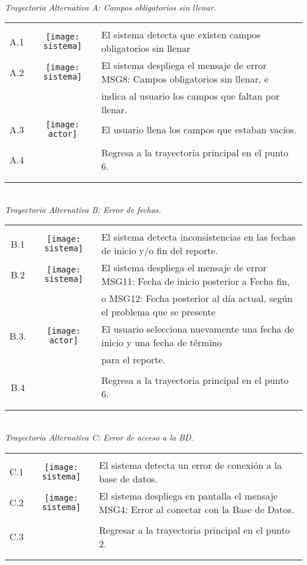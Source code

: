 \documentclass[10pt,spanish]{article}
\providecommand{\tabularnewline}{\\}
\begin{document}
\newpage
	\textit{\large \\Trayectoria Alternativa A: Campos obligatorios sin llenar.}
	
	\begin{tabular}{ccl}
	& & \tabularnewline
			
	A.1 & \texttt{[image: sistema]} & El sistema detecta que existen campos obligatorios sin llenar\tabularnewline
	
	A.2 & \texttt{[image: sistema]} & El sistema despliega el mensaje de error MSG8: Campos obligatorios sin llenar, e \tabularnewline
	& & indica al usuario los campos que faltan por llenar. \tabularnewline

    A.3 & \texttt{[image: actor]} & El usuario llena los campos que estaban vacíos.\tabularnewline
	\tabularnewline
	
	A.4 & &	Regresa a la trayectoria principal en el punto 6.\tabularnewline

	
	\tabularnewline\tabularnewline	
	\end{tabular}
	
	\textit{\large \\Trayectoria Alternativa B: Error de fechas.}
	
	\begin{tabular}{ccl}
	& & \tabularnewline
			
	B.1 & \texttt{[image: sistema]} & El sistema detecta inconsistencias en las fechas de inicio y/o fin del reporte.\tabularnewline
	
	B.2 & \texttt{[image: sistema]} & El sistema despliega el mensaje de error MSG11: Fecha de inicio posterior a Fecha fin,  \tabularnewline
	& & o MSG12: Fecha posterior al día actual, según el problema que se presente \tabularnewline

    B.3. & \texttt{[image: actor]} & El usuario selecciona nuevamente una fecha de inicio y una fecha de término \tabularnewline
	&  & para el reporte.\tabularnewline\tabularnewline
	
	B.4 & &	Regresa a la trayectoria principal en el punto 6.\tabularnewline

	
	\tabularnewline\tabularnewline	
	\end{tabular}

\textit{\large \\Trayectoria Alternativa C: Error de acceso a la BD.}

\begin{tabular}{ccl}
	& & \tabularnewline
	
	C.1 & \texttt{[image: sistema]} & El sistema detecta un error de conexión a la base de datos.\tabularnewline
		
	C.2 & \texttt{[image: sistema]} & El sistema despliega en pantalla el mensaje MSG4: Error al conectar con la Base de Datos. 	\tabularnewline	\tabularnewline	
		
	C.3 & & Regresar a la trayectoria principal en el punto 2.\tabularnewline

	
	\tabularnewline\tabularnewline	
	\end{tabular}
\end{document}

